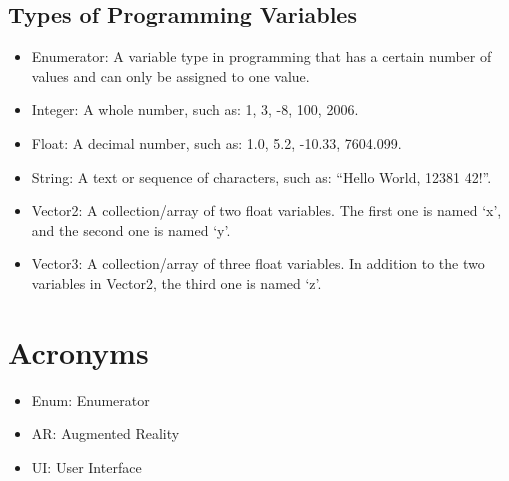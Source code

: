 \documentclass[a4paper, 12pt]{article}
\begin{document}
\subsection{Types of Programming Variables}
\begin{itemize}
    \item{Enumerator: A variable type in programming that has a certain number of values and can only be assigned to one value.}
    
    \item{Integer: A whole number, such as: 1, 3, -8, 100, 2006.}
    
    \item{Float: A decimal number, such as: 1.0, 5.2, -10.33, 7604.099.}
    
    \item{String: A text or sequence of characters, such as: “Hello World, 12381 42!”.}
    
    \item{Vector2: A collection/array of two float variables. The first one is named ‘x’, and the second one is named ‘y’.}
    
    \item{Vector3: A collection/array of three float variables. In addition to the two variables in Vector2, the third one is named ‘z’.}
 \end{itemize}
\section{Acronyms}

\begin{itemize}
    \item{Enum: Enumerator}
    
    \item{AR: Augmented Reality}
    
    \item{UI: User Interface}
\end{itemize}

\printbibliography
\end{document}
